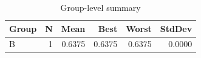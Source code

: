 \begin{table}[htbp]
\centering
\caption{Group-level summary}
\label{tab:group-summary}
\begin{tabular}{lrrrrr}
\toprule
\textbf{Group} & \textbf{N} & \textbf{Mean} & \textbf{Best} & \textbf{Worst} & \textbf{StdDev} \\
\midrule
B & 1 & 0.6375 & 0.6375 & 0.6375 & 0.0000 \\
\bottomrule
\end{tabular}
\end{table}
